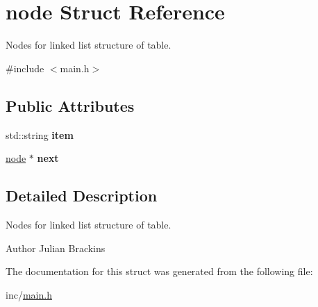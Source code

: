 \hypertarget{structnode}{\section{node Struct Reference}
\label{structnode}
}


Nodes for linked list structure of table.  




{\ttfamily \#include $<$main.\-h$>$}

\subsection*{Public Attributes}
\begin{DoxyCompactItemize}
\item 
\hypertarget{structnode_a6983ad3505c5af35fbac2c49f5619d73}{std\-::string {\bfseries item}}\label{structnode_a6983ad3505c5af35fbac2c49f5619d73}

\item 
\hypertarget{structnode_aad210fa7c160a49f6b9a3ffee592a2bc}{\hyperlink{structnode}{node} $\ast$ {\bfseries next}}\label{structnode_aad210fa7c160a49f6b9a3ffee592a2bc}

\end{DoxyCompactItemize}


\subsection{Detailed Description}
Nodes for linked list structure of table. 

\begin{DoxyAuthor}{Author}
Julian Brackins 
\end{DoxyAuthor}


The documentation for this struct was generated from the following file\-:\begin{DoxyCompactItemize}
\item 
inc/\hyperlink{main_8h}{main.\-h}\end{DoxyCompactItemize}
